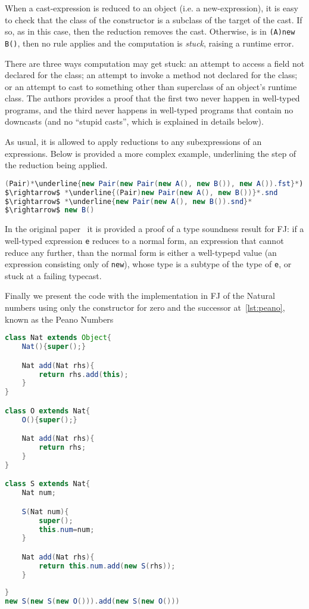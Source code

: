 When a cast-expression is reduced to an object (i.e. a new-expression), it is
easy to check that the class of the constructor is a subclass of the target of
the cast. If so, as in this case, then the reduction removes the cast.
Otherwise, is in \texttt{(A)new B()}, then no rule applies and the computation
is \textit{stuck}, raising a runtime error.

There are three ways computation may get stuck: an attempt to access a field
not declared for the class; an attempt to invoke a method not declared for the
class; or an attempt to cast to something other than superclass of an object's
runtime class. The authors provides a proof that the first two never happen in
well-typed programs, and the third never happens in well-typed programs that
contain no downcasts (and no ``stupid casts'', which is explained in details
below).

As usual, it is allowed to apply reductions to any subexpressions of an
expressions. Below is provided a more complex example, underlining the step of
the reduction being applied.
\begin{lstlisting}[language=Java, mathescape = true, escapechar = \*]
   (Pair)*\underline{new Pair(new Pair(new A(), new B()), new A()).fst}*).snd
$\rightarrow$ *\underline{(Pair)new Pair(new A(), new B())}*.snd
$\rightarrow$ *\underline{new Pair(new A(), new B()).snd}*
$\rightarrow$ new B()
\end{lstlisting}

In the original paper~\cite{Igarashi99featherweightjava} it is provided a proof
of a type soundness result for FJ: if a well-typed expression \texttt{e}
reduces to a normal form, an expression that cannot reduce any further, than
the normal form is either a well-typepd value (an expression consisting only of
\texttt{new}), whose type is a subtype of the type of \texttt{e}, or stuck at a
failing typecast.

Finally we present the code with the implementation in FJ of the
Natural numbers using only the constructor for zero and the successor at~\cref{lst:peano}, known as
the Peano Numbers~\cite{Peano1889}

\begin{lstlisting}[frame=single, caption={Peano Encoding for Naturals in FJ}, label={lst:peano}, language=Java, float,floatplacement=H]
class Nat extends Object{
    Nat(){super();}

    Nat add(Nat rhs){
        return rhs.add(this);
    }
}

class O extends Nat{
    O(){super();}

    Nat add(Nat rhs){
        return rhs;
    }
}

class S extends Nat{
    Nat num;

    S(Nat num){
        super();
        this.num=num;
    }

    Nat add(Nat rhs){
        return this.num.add(new S(rhs));
    }
    
}
new S(new S(new O())).add(new S(new O()))
\end{lstlisting}

